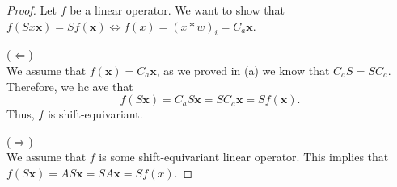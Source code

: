 \documentclass[twoside]{article}
\begin{document}
\begin{proof}
	Let $f$ be a linear operator. We want to show that $f(Sx \bm{x}) = Sf(\bm{x}) \iff f(x) = (x * w)_{i} = C_{a}\bm{x}$.

	($\Leftarrow$)\\
	We assume that $f(\bm{x}) = C_{a} \bm{x}$, as we proved in (a) we know that $C_{a}S = SC_{a}$.
	Therefore, we hc ave that
	\begin{equation*}
		f(S \bm{x}) = C_{a}S \bm{x} = SC_{a}\bm{x} = Sf(\bm{x}).
	\end{equation*}
	Thus, $f$ is shift-equivariant.

	($\Rightarrow$)\\
	We assume that $f$ is some shift-equivariant linear operator.
	This implies that $f(S \bm{x}) = AS \bm{x} = SA \bm{x} = Sf(x)$.


\end{proof}
\end{document}
